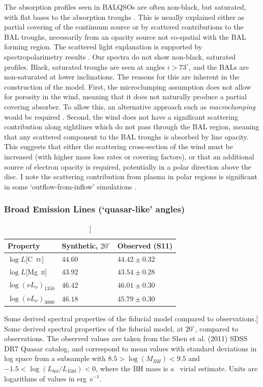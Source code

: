 The absorption profiles seen in BALQSOs are often non-black, but saturated, 
with flat bases to the absorption troughs \citep{arav1999b,arav1999a}.
This is usually explained either as  partial covering of the continuum
source or by scattered contributions to the BAL troughs, necessarily
from an opacity source not co-spatial with the BAL forming region.
The scattered light explanation is supported by spectropolarimetry results
\citep{lamy2000}. Our spectra do not show non-black, saturated profiles.
Black, saturated troughs are seen at angles $i > 73^\circ$, and the BALs
are non-saturated at lower inclinations. The reasons for this are inherent 
in the construction of the model. 
First, the microclumping assumption does not allow for 
porosity in the wind, meaning that it does not naturally produce
a partial covering absorber. To allow this, an alternative approach
such as {\em macroclumping} would be required \citep[e.g.][]{hamann2008,surlan2012}.
Second, the wind does not have a significant scattering contribution 
along sightlines which do not pass through the BAL region,
meaning that any scattered component to the BAL troughs is absorbed by line opacity.
This suggests that either the scattering cross-section of the wind must
be increased (with higher mass loss rates or covering factors), or 
that an additional source of electron opacity is required, potentially
in a polar direction above the disc. I note the scattering contribution
from plasma in polar regions is significant in some `outflow-from-inflow'
simulations \citep{KP09, simproga2012}.

\subsubsection{Broad Emission Lines (`quasar-like' angles)}

\begin{table}
\centering
\begin{tabular}{p{2cm}p{2cm}p{3cm}}
\hline Property & Synthetic, $20^\circ$ & Observed  (S11) \\ 
\hline \hline
$\log L$[C~\textsc{iv}]  & $44.60$ & $44.42 \pm 0.32$  \\
$\log L$[Mg~\textsc{ii}] & $43.92$ & $43.54 \pm 0.28$  \\
$\log (\nu L_{\nu})_{1350}$  & $46.42$ & $46.01 \pm 0.30$ \\
$\log (\nu L_{\nu})_{3000}$  & $46.18$ & $45.79 \pm 0.30$ \\
\hline
\end{tabular}
\caption
[Some derived spectral properties of the fiducial model compared to observations.]
{
Some derived spectral properties of the fiducial model, at $20^\circ$,
compared to observations. The observed values are taken from the Shen et al. (2011)
SDSS DR7 Quasar catalog, and correspond to mean values with standard deviations in log space
from a subsample with $8.5>\log(M_{BH})<9.5$ and $-1.5<\log (L_{bol}/L_{Edd}) < 0$,
where the BH mass is a \civ\ virial estimate. 
Units are logarithms of values in erg~s$^{-1}$.
}
\label{line_lums}
\end{table}


